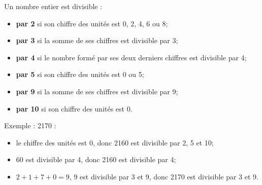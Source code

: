 \documentclass[12pt,a4paper]{article}
\begin{document}
\begin{mybilan}
	Un nombre entier est divisible :
	\begin{itemize}
		\item \textbf{par \num{2}} si son chiffre des unités est \num{0}, \num{2}, \num{4}, \num{6} ou \num{8};
		\item \textbf{par \num{3}} si la somme de ses chiffres est divisible par \num{3};
		\item \textbf{par \num{4}} si le nombre formé par ses deux derniers chiffres est divisible par \num{4};
		\item \textbf{par \num{5}} si son chiffre des unités est \num{0} ou \num{5};
		\item \textbf{par \num{9}} si la somme de ses chiffres est divisible par \num{9};
		\item \textbf{par \num{10}} si son chiffre des unités est \num{0}.
	\end{itemize}
\end{mybilan}

\begin{myex}
	Exemple : \num{2170} :
	\begin{itemize}
		\item le chiffre des unités est \num{0}, donc \num{2160} est divisible par \num{2}, \num{5} et \num{10};
		\item \num{60} est divisible par \num{4}, donc \num{2160} est divisible par \num{4};
		\item $\num{2}+\num{1}+\num{7}+\num{0}=\num{9}$, \num{9} est divisible par \num{3} et \num{9}, donc \num{2170} est divisible par \num{3} et \num{9}.
	\end{itemize}
\end{myex}
\end{document}
